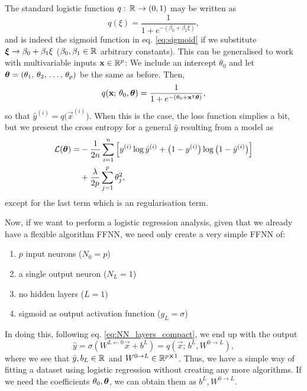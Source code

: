 The standard logistic function $q:\, \RR \to (0,1)$ may be written as 
\begin{equation}\label{eq:logistic_function}
    q(\xi) = \frac{1}{1+e^{-(\beta_0 + \beta_1\xi)}},
\end{equation}
and is indeed the sigmoid function in eq. \eqref{eq:sigmoid} if we substitute $\svec{\xi} \to \beta_0 + \beta_1 \xi$ ($\beta_0, \beta_1 \in \RR$ arbitrary constants). This can be generalised to work with multivariable inputs $\vec{x}\in \RR[p]$: We include an intercept $\theta_0$ and let $\svec{\theta} = (\theta_1, \, \theta_2, \, \dots,\, \theta_p)$ be the same as before. Then,
\begin{equation}\label{eq:logistic_function_fit}
    q(\vec{x};\,\theta_0, \svec{\theta}) = \frac{1}{1+e^{-(\theta_0 + \vec{x}\TT \svec{\theta})}},
\end{equation}
so that $\hat{y}^{(i)} = q\big(\vec{x}^{(i)}\big)$. When this is the case, the loss function simplies a bit, but we present the cross entropy for a general $\hat{y}$ resulting from a model as
\begin{equation}\label{eq:logistic_regression_cost_function}
    \begin{split}
        \mathcal{L}(\svec{\theta}) =& -  \frac{1}{2n}\sum_{i=1}^n \Big[ y^{(i)} \log{\hat{y}^{(i)}} + \big(1-y^{(i)}\big) \log{\big(1-\hat{y}^{(i)}\big)}\Big] \\
        &+ \frac{\lambda}{2p}\sum_{j=1}^p \theta_j^2,
    \end{split}
\end{equation}
except for the last term which is an \lnorm[2] regularisation term.

Now, if we want to perform a logistic regression analysis, given that we already have a flexible algorithm FFNN, we need only create a very simple FFNN of: 
\begin{enumerate}[label=*]
    \item $p$ input neurons ($N_0=p$)
    \item a single output neuron ($N_L=1$)
    \item no hidden layers ($L=1$)
    \item sigmoid as output activation function ($g_L=\sigma$)
\end{enumerate}
In doing this, following eq. \eqref{eq:NN_layers_compact}, we end up with the output 
\begin{equation}
    \hat{y} = \sigma(W^{L\leftarrow 0}\vec{x} + b^L) = q(\vec{x};\, b^L, W^{0 \to L}),
\end{equation}
where we see that $\hat{y}, b_L\in \RR$ and $ W^{0\to L} \in \RR[p\cross 1]$. Thus, we have a simple way of fitting a dataset using logistic regression without creating any more algorithms. If we need the coefficients $\theta_0, \svec{\theta}$, we can obtain them as $b^L, W^{0\to L}$.

